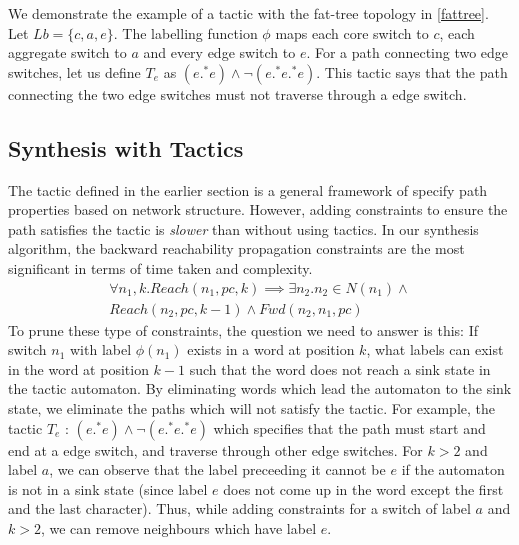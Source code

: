 \documentclass[]{sig}
\begin{document}
We demonstrate the example of a tactic with the fat-tree topology in \cref{fattree}. Let $Lb = \{c, a, e\}$. The labelling function $\phi$ maps each core switch to $c$, each aggregate switch to $a$ and every edge switch to $e$. For a path connecting two edge switches, let us define $T_e$ as $(e .^* e) \wedge \neg (e .^* e .^* e)$. This tactic says that the path connecting the two edge switches must not traverse through a edge switch.

\subsection{Synthesis with Tactics}
The tactic defined in the earlier section is a general framework of specify path properties based on network structure. However, adding constraints to ensure the path satisfies the tactic is \emph{slower} than without using tactics. In our synthesis algorithm, the backward reachability propagation constraints are the most significant in terms of time taken and complexity. 
\begin{multline}
\forall n_1,k.  Reach(n_1,pc,k) \implies \exists n_2.  n_2 \in N(n_1) \wedge \\ Reach(n_2,pc,k-1) \wedge Fwd(n_2,n_1,pc)
\end{multline} 
To prune these type of constraints, the question we need to answer is this: If switch $n_1$ with label $\phi(n_1)$ exists in a word at position $k$, what labels can exist in the word at position $k - 1$ such that the word does not reach a sink state in the tactic automaton. By eliminating words which lead the automaton to the sink state, we eliminate the paths which will not satisfy the tactic. For example, the tactic $T_e$ : $(e .^* e) \wedge \neg (e .^* e .^* e)$ which specifies that the path must start and end at a edge switch, and traverse through other edge switches. For $k > 2$ and label $a$, we can observe that the label preceeding it cannot be $e$ if the automaton is not in a sink state (since label $e$ does not come up in the word except the first and the last character). Thus, while adding constraints for a switch of label $a$ and $k > 2$, we can remove neighbours which have label $e$.  
\end{document}
